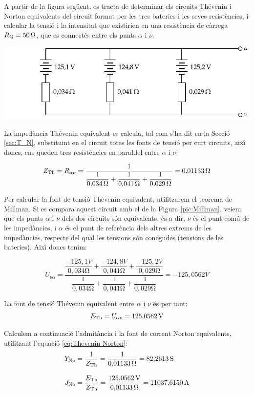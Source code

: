 \begin{exemple}

A partir de la figura seg\"{u}ent, es tracta de determinar els circuits
Th\'{e}venin i Norton equivalents del circuit format per les tres
bateries i les seves resist\`{e}ncies, i calcular la tensi\'{o} i la
intensitat que existirien en una resist\`{e}ncia de c\`{a}rrega
$R_\mathrm{Q}=50\mathrm{\,\mathrm{\Omega}}$, que es connect\'{e}s entre els punts $\alpha$
i $\nu$.

\includegraphics{Imatges/Cap-Fonaments-Millman-Exemple.pdf}

La imped\`{a}ncia Th\'{e}venin equivalent es calcula, tal com s'ha dit en la Secci\'{o} \ref{sec:T_N},
substituint en el circuit totes les fonts de tensi\'{o} per curt circuits, aix\'{\i} doncs, ens
queden tres resist\`{e}ncies en para{\l.l}el entre $\alpha$ i $\nu$:

\[
Z_\mathrm{Th} = R_{\alpha\nu} =\frac{1}{\dfrac{1}{0{,}034\mathrm{\,\mathrm{\Omega}}} +
\dfrac{1}{0{,}041\mathrm{\,\mathrm{\Omega}}} + \dfrac{1}{0{,}029\mathrm{\,\mathrm{\Omega}}}} =
0{,}01133\mathrm{\,\mathrm{\Omega}}
\]

Per calcular la font de tensi\'{o} Th\'{e}venin equivalent, utilitzarem el
teorema de Millman. Si es compara aquest circuit amb el de la Figura
\vref{pic:Millman}, veiem que els punts $\alpha$ i $\nu$ dels dos
circuits s\'{o}n equivalents, \'{e}s a dir, $\nu$ \'{e}s el punt com\'{u} de les
imped\`{a}ncies, i $\alpha$ \'{e}s el punt de refer\`{e}ncia dels altres extrems
de les imped\`{a}ncies, respecte del qual les tensions s\'{o}n conegudes
(tensions de les bateries). Aix\'{\i} doncs tenim:

\[
U_{\nu\alpha} = \frac{\dfrac{-125{,}1\unit{V}}{0{,}034\unit{\ohm}} +
\dfrac{-124{,}8\unit{V}}{0{,}041\unit{\ohm}} +
\dfrac{-125{,}2\unit{V}}{0{,}029\unit{\ohm}}}{\dfrac{1}{0{,}034\unit{\ohm}}
+ \dfrac{1}{0{,}041\unit{\ohm}} + \dfrac{1}{0{,}029\unit{\ohm}}} =
-125{,}0562\unit{V}
\]

La font de tensi\'{o}  Th\'{e}venin equivalent entre $\alpha$ i $\nu$ \'{e}s per
tant:
\[
E_\mathrm{Th} = U_{\alpha\nu} = 125{,}0562\mathrm{\,V}
\]

Calculem a continuaci\'{o} l'admit\`{a}ncia i la font de corrent  Norton equivalents, utilitzant
l'equaci\'{o} \eqref{eq:Thevenin-Norton}:
\begin{align*}
    Y_\mathrm{No} &= \frac{1}{Z_\mathrm{Th}} = \frac{1}{0{,}01133\mathrm{\,\mathrm{\Omega}}} = 82{,}2613\mathrm{\,S}
    \\[2ex]
    J_\mathrm{No} &= \frac{E_\mathrm{Th}}{Z_\mathrm{Th}} =
    \frac{125{,}0562\mathrm{\,V}}{0{,}01133\mathrm{\,\mathrm{\Omega}}}= 11037{,}6150\mathrm{\,A}
\end{align*}


\end{exemple}
